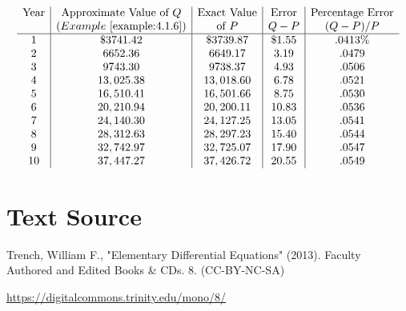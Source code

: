 \documentclass{ximera}
\begin{document}
$$
\begin{array}{c|c|c|c|c}
\text{Year} & \text{Approximate Value of } Q & \text{Exact Value} & \text{Error} & \text{Percentage
Error}\\
& (Example~\ref{example:4.1.6}) & \text{of } P
& Q-P &
(Q-P)/P\\
\hline
  1 & \$ 3741.42 & \$ 3739.87 & \$ 1.55 &.0413 \% \\
  2 &   6652.36 &  6649.17 & 3.19 &.0479\\
  3 & 9743.30 &9738.37 &4.93 &.0506\\
  4 &  13,025.38 &  13,018.60 &6.78 & .0521\\
  5 &  16,510.41 &  16,501.66 & 8.75 &.0530 \\
  6 &  20,210.94 &  20,200.11 & 10.83 & .0536\\
  7 &  24,140.30 &  24,127.25 & 13.05 &.0541 \\
  8 &  28,312.63 &  28,297.23 & 15.40 &.0544 \\
  9 &  32,742.97 &  32,725.07 & 17.90 & .0547 \\
 10 &  37,447.27 &  37,426.72 & 20.55 & .0549 
 \end{array}
$$


\section*{Text Source}
Trench, William F., "Elementary Differential Equations" (2013). Faculty Authored and Edited Books \& CDs. 8. (CC-BY-NC-SA)

\href{https://digitalcommons.trinity.edu/mono/8/}{https://digitalcommons.trinity.edu/mono/8/}
\end{document}
